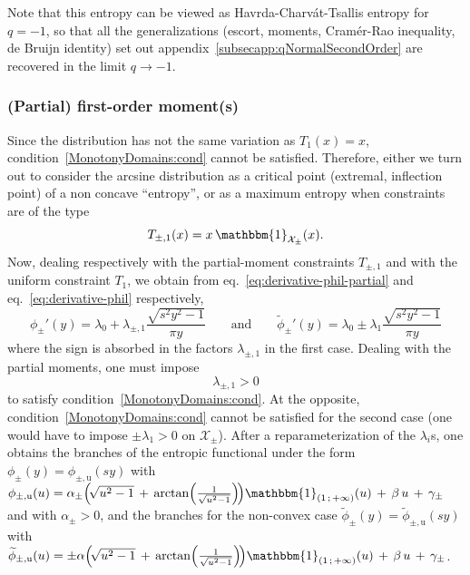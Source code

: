 \documentclass[entropy,article,submit,moreauthors,pdftex]{Definitions/mdpi}
\def\X{\mathcal{X}}%
\def\un{\mathbbm{1}}%
\def\u{\mathrm{u}}
\begin{document}
Note that this entropy can be  viewed as Havrda-Charv\'at-Tsallis entropy for $q
=  -1$,  so   that  all  the  generalizations   (escort,  moments,  Cram\'er-Rao
inequality,         de         Bruijn          identity)         set         out
appendix~\ref{subsecapp:qNormalSecondOrder} are  recovered in  the limit  $q \to
-1$.



\subsubsection{(Partial) first-order moment(s)}
\label{subsubsecapp:ArcsineFirstPartial}

Since  the   distribution  has  not  the   same  variation  as  $T_1(x)   =  x$,
condition~\ref{MonotonyDomains:cond} cannot  be satisfied. Therefore,  either we
turn out  to consider the  arcsine distribution  as a critical  point (extremal,
inflection point)  of a non  concave ``entropy'', or  as a maximum  entropy when
constraints are of the type
%
\[
T_{\pm,1}(x) = x \, \un_{\X_\pm}(x).
\]
%
Now, dealing  respectively with  the partial-moment constraints  $T_{\pm,1}$ and
with     the      uniform     constraint      $T_1$,     we      obtain     from
eq.~\eqref{eq:derivative-phil-partial}     and    eq.~\eqref{eq:derivative-phil}
respectively,
%
\[
\phi_\pm'(y)  = \lambda_0  + \lambda_{\pm,1}  \frac{\sqrt{s^2 y^2  - 1}}{\pi  y}
\qquad  \mbox{and} \qquad  \widetilde{\phi}_\pm'(y)  =  \lambda_0 \pm  \lambda_1
\frac{\sqrt{s^2 y^2 - 1}}{\pi y}
\]
%
where the sign  is absorbed in the factors $\lambda_{\pm,1}$  in the first case.
Dealing with  the partial moments,  one must  impose $$\lambda_{\pm,1} >  0$$ to
satisfy     condition~\ref{MonotonyDomains:cond}.       At     the     opposite,
condition~\ref{MonotonyDomains:cond}  cannot be  satisfied for  the second  case
(one  would  have  to  impose  $\pm  \lambda_1  >  0$  on  $\X_\pm$).   After  a
reparameterization of the $\lambda_i$s, one obtains the branches of the entropic
functional   under   the   form   $\phi_\pm(y)  =   \phi_{\pm,\u}(s   y)$   with
$\phi_{\pm,\u}(u) = \alpha_\pm  \left( \!  \sqrt{u^2 - 1} \,  + \, \arctan\left(
\frac{1}{\sqrt{u^2  - 1}}  \right) \!   \right) \un_{\left(  1 \,  ; \,  +\infty
  \right)}(u) \, + \, \beta \, u \,  + \, \gamma_\pm$ and with $\alpha_\pm > 0$,
and   the  branches   for   the  non-convex   case  $\widetilde{\phi}_\pm(y)   =
\widetilde{\phi}_{\pm,\u}(s y)$ with  $\widetilde{\phi}_{\pm,\u}(u) = \pm \alpha
\left( \! \sqrt{u^2 - 1} \,  + \, \arctan\left( \frac{1}{\sqrt{u^2 - 1}} \right)
\! \right) \un_{\left( 1 \, ; \, +\infty \right)}(u)  \, + \, \beta \, u \, + \,
\gamma_\pm$.
\end{document}

